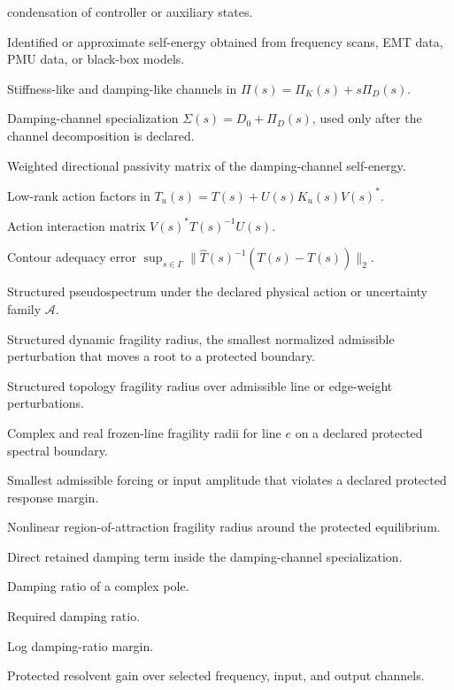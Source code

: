 \begin{description}[leftmargin=3.2cm,style=nextline]
condensation of controller or auxiliary states.
\item[\(\widehat\Pi(s)\)] Identified or approximate self-energy obtained from
frequency scans, EMT data, PMU data, or black-box models.
\item[\(\Pi_K(s),\Pi_D(s)\)] Stiffness-like and damping-like channels in
\(\Pi(s)=\Pi_K(s)+s\Pi_D(s)\).
\item[\(\Sigma(s)\)] Damping-channel specialization
\(\Sigma(s)=D_0+\Pi_D(s)\), used only after the channel decomposition is
declared.
\item[\(\mathcal P_\Sigma(\omega)\)] Weighted directional passivity matrix of
the damping-channel self-energy.
\item[\(U,K_u,V\)] Low-rank action factors in
\(T_u(s)=T(s)+U(s)K_u(s)V(s)^*\).
\item[\(\mathcal G_u(s)\)] Action interaction matrix
\(V(s)^*T(s)^{-1}U(s)\).
\item[\(\eta_\Gamma\)] Contour adequacy error
\(\sup_{s\in\Gamma}\|\widehat T(s)^{-1}(T(s)-\widehat T(s))\|_2\).
\item[\(\Lambda_\varepsilon^{\mathcal A}(T)\)] Structured pseudospectrum under
the declared physical action or uncertainty family \(\mathcal A\).
\item[\(r_{\rm frag}\)] Structured dynamic fragility radius, the smallest
normalized admissible perturbation that moves a root to a protected boundary.
\item[\(r_{\rm top}\)] Structured topology fragility radius over admissible
line or edge-weight perturbations.
\item[\(r_e^{\C},r_e^{\R}\)] Complex and real frozen-line fragility radii for
line \(e\) on a declared protected spectral boundary.
\item[\(r_{\rm forced}\)] Smallest admissible forcing or input amplitude that
violates a declared protected response margin.
\item[\(r_{\rm ROA}\)] Nonlinear region-of-attraction fragility radius around
the protected equilibrium.
\item[\(D_0\)] Direct retained damping term inside the damping-channel
specialization.
\item[\(\zeta\)] Damping ratio of a complex pole.
\item[\(\zetaReq\)] Required damping ratio.
\item[\(S_\zeta\)] Log damping-ratio margin.
\item[\(g_{\rm prot}\)] Protected resolvent gain over selected frequency,
input, and output channels.

\end{description}
